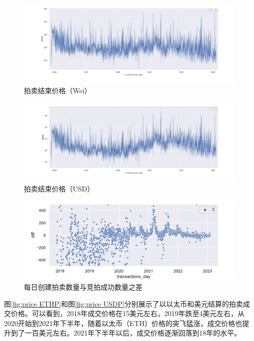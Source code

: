 \documentclass{myreport}
\begin{document}
\begin{figure}[!htbp]
	\centering
	\includegraphics[width=\linewidth]{figure/price ETHeP.pdf}
	\caption{拍卖结束价格（Wei）}
	\label{fig:price ETHeP}
\end{figure}
\begin{figure}[!htbp]
	\centering
	\includegraphics[width=\linewidth]{figure/price USDeP.pdf}
	\caption{拍卖结束价格（USD）}
	\label{fig:price USDeP}
\end{figure}

\begin{figure}[!htbp]
	\centering
	\includegraphics[width=\linewidth]{figure/createMinusBid.pdf}
	\caption{每日创建拍卖数量与竞拍成功数量之差}
	\label{fig:createMinusBid}
\end{figure}



图\ref{fig:price ETHP}和图\ref{fig:price USDP}分别展示了以以太币和美元结算的拍卖成交价格。可以看到，2018年成交价格在15美元左右，2019年跌至4美元左右，从2020开始到2021年下半年，随着以太币（ETH）价格的突飞猛涨，成交价格也提升到了一百美元左右。2021年下半年以后，成交价格逐渐回落到18年的水平。
\end{document}
